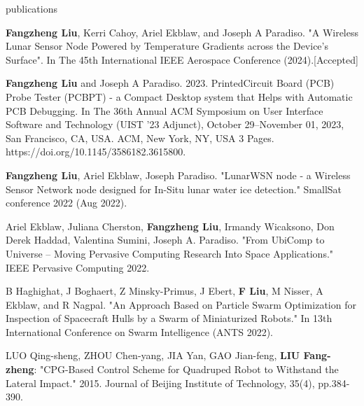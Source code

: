 \documentclass{resume} %
\begin{document}
\begin{rSection}{publications}
\begin{itemlabel}
\item \textbf{Fangzheng Liu}, Kerri Cahoy, Ariel Ekblaw, and Joseph A Paradiso. "A Wireless Lunar Sensor Node Powered by Temperature Gradients across the Device's Surface". In The 45th International IEEE Aerospace Conference (2024).[Accepted]
\smallskip
\smallskip
\smallskip

\item \textbf{Fangzheng Liu} and Joseph A Paradiso. 2023. PrintedCircuit Board (PCB) Probe Tester (PCBPT) - a Compact Desktop system that Helps with Automatic PCB Debugging. In The 36th Annual ACM Symposium on User Interface Software and Technology (UIST '23 Adjunct), October 29--November 01, 2023, San Francisco, CA, USA. ACM, New York, NY, USA 3 Pages. https://doi.org/10.1145/3586182.3615800.
\smallskip
\smallskip
\smallskip

\item \textbf{Fangzheng Liu}, Ariel Ekblaw, Joseph Paradiso. "LunarWSN node - a Wireless Sensor Network node designed for In-Situ lunar water ice detection." SmallSat conference 2022 (Aug 2022).
\smallskip
\smallskip
\smallskip

\item Ariel Ekblaw, Juliana Cherston, \textbf{Fangzheng Liu}, Irmandy Wicaksono, Don Derek Haddad, Valentina Sumini, Joseph A. Paradiso. "From UbiComp to Universe – Moving Pervasive Computing Research Into Space Applications." IEEE Pervasive Computing 2022.
\smallskip
\smallskip
\smallskip

\item B Haghighat, J Boghaert, Z Minsky-Primus, J Ebert, \textbf{F Liu}, M Nisser, A Ekblaw, and R Nagpal. "An Approach Based on Particle Swarm Optimization for Inspection of Spacecraft Hulls by a Swarm of Miniaturized Robots." In 13th International Conference on Swarm Intelligence (ANTS 2022).
\smallskip
\smallskip

\item LUO Qing-sheng, ZHOU Chen-yang, JIA Yan, GAO Jian-feng, \textbf{LIU Fang-zheng}: "CPG-Based Control Scheme for Quadruped Robot to Withstand the Lateral Impact." 2015. Journal of Beijing Institute of Technology, 35(4), pp.384-390.
\end{itemlabel}
\end{rSection}
\end{document}
